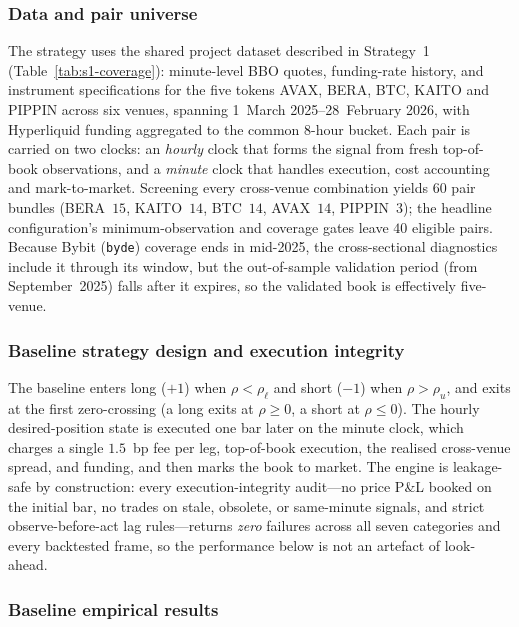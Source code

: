 \documentclass[10pt,twocolumn,a4paper]{article}
\begin{document}
\subsubsection{Data and pair universe}

The strategy uses the shared project dataset described in Strategy~1 (Table~\ref{tab:s1-coverage}): minute-level BBO quotes, funding-rate history, and instrument specifications for the five tokens AVAX, BERA, BTC, KAITO and PIPPIN across six venues, spanning 1~March 2025--28~February 2026, with Hyperliquid funding aggregated to the common 8-hour bucket. Each pair is carried on two clocks: an \emph{hourly} clock that forms the signal from fresh top-of-book observations, and a \emph{minute} clock that handles execution, cost accounting and mark-to-market. Screening every cross-venue combination yields $60$ pair bundles (BERA~$15$, KAITO~$14$, BTC~$14$, AVAX~$14$, PIPPIN~$3$); the headline configuration's minimum-observation and coverage gates leave $40$ eligible pairs. Because Bybit (\texttt{byde}) coverage ends in mid-2025, the cross-sectional diagnostics include it through its window, but the out-of-sample validation period (from September~2025) falls after it expires, so the validated book is effectively five-venue.

\subsubsection{Baseline strategy design and execution integrity}

The baseline enters long ($+1$) when $\rho<\rho_\ell$ and short ($-1$) when $\rho>\rho_u$, and exits at the first zero-crossing (a long exits at $\rho\ge0$, a short at $\rho\le0$). The hourly desired-position state is executed one bar later on the minute clock, which charges a single $1.5$~bp fee per leg, top-of-book execution, the realised cross-venue spread, and funding, and then marks the book to market. The engine is leakage-safe by construction: every execution-integrity audit---no price P\&L booked on the initial bar, no trades on stale, obsolete, or same-minute signals, and strict observe-before-act lag rules---returns \emph{zero} failures across all seven categories and every backtested frame, so the performance below is not an artefact of look-ahead.

\subsubsection{Baseline empirical results}
\end{document}
